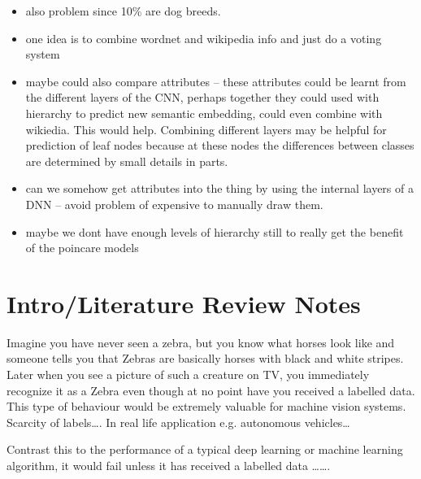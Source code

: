 \documentclass[12pt]{report}
\begin{document}
\begin{itemize}
    \item also problem since 10\% are dog breeds.
    \item one idea is to combine wordnet and wikipedia info and just do a voting system
    \item maybe could also compare attributes -- these attributes could be learnt from the different layers of the CNN, perhaps together they could used with hierarchy to predict new semantic embedding, could even combine with wikiedia. This would help. Combining different layers may be helpful for prediction of leaf nodes because at these nodes the differences between classes are determined by small details in parts.
    \item can we somehow get attributes into the thing by using the internal layers of a DNN -- avoid problem of expensive to manually draw them.
    \item maybe we dont have enough levels of hierarchy still to really get the benefit of the poincare models
\end{itemize}

\chapter{Intro/Literature Review Notes}

Imagine you have never seen a zebra, but you know what horses look like and someone tells you that Zebras are basically horses with black and white stripes. Later when you see a picture of such a creature on TV, you immediately recognize it as a Zebra even though at no point have you received a labelled data. This type of behaviour would be extremely valuable for machine vision systems. Scarcity of labels\dots. In real life application e.g. autonomous vehicles\dots

Contrast this to the performance of a typical deep learning or machine learning algorithm, it would fail unless it has received a labelled data \dots\dots.
\end{document}
